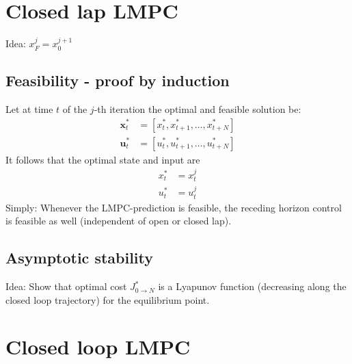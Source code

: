 \documentclass{article}
\begin{document}
\section{Closed lap LMPC}
Idea: $x_F^j = x_0^{j+1}$
\subsection{Feasibility - proof by induction}
Let at time $t$ of the $j$-th iteration the optimal and feasible solution be:
\begin{align}
\mathbf{x}_t^* &= [x_t^*, x_{t+1}^*, \dots ,x_{t+N}^* ]\\
\mathbf{u}_t^* &= [u_t^*, u_{t+1}^*, \dots ,u_{t+N}^* ]
\end{align}
It follows that the optimal state and input are
\begin{align}
x_t^* &= x_t^j\\
u_t^* &= u_t^j
\end{align}
Simply: Whenever the LMPC-prediction is feasible, the receding horizon control is feasible as well (independent of open or closed lap).

\subsection{Asymptotic stability}
Idea: Show that optimal cost $J_{0\rightarrow N}^*$ is a Lyapunov function (decreasing along the closed loop trajectory) for the equilibrium point.

\section{Closed loop LMPC}
\end{document}
